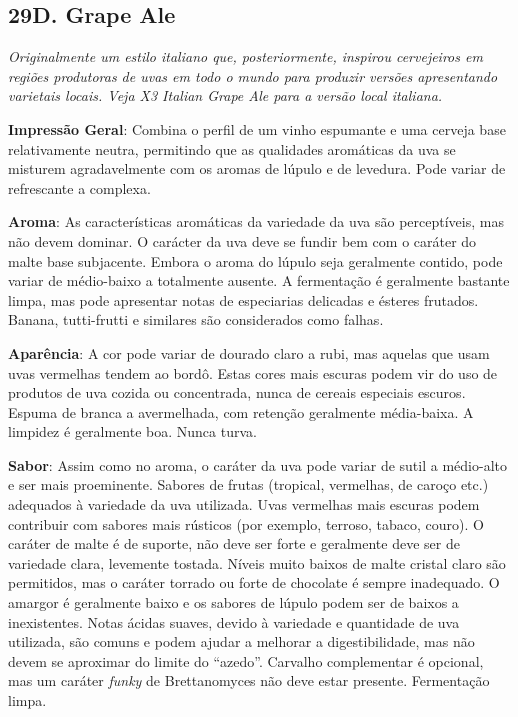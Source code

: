 \subsection*{29D. Grape Ale}
\textit{Originalmente um estilo italiano que, posteriormente, inspirou cervejeiros em regiões produtoras de uvas em todo o mundo para produzir versões apresentando varietais locais. Veja X3 Italian Grape Ale para a versão local italiana.}

\textbf{Impressão Geral}: Combina o perfil de um vinho espumante e uma cerveja base relativamente neutra, permitindo que as qualidades aromáticas da uva se misturem agradavelmente com os aromas de lúpulo e de levedura. Pode variar de refrescante a complexa.

\textbf{Aroma}: As características aromáticas da variedade da uva são perceptíveis, mas não devem dominar. O carácter da uva deve se fundir bem com o caráter do malte base subjacente. Embora o aroma do lúpulo seja geralmente contido, pode variar de médio-baixo a totalmente ausente. A fermentação é geralmente bastante limpa, mas pode apresentar notas de especiarias delicadas e ésteres frutados. Banana, tutti-frutti e similares são considerados como falhas.

\textbf{Aparência}: A cor pode variar de dourado claro a rubi, mas aquelas que usam uvas vermelhas tendem ao bordô. Estas cores mais escuras podem vir do uso de produtos de uva cozida ou concentrada, nunca de cereais especiais escuros. Espuma de branca a avermelhada, com retenção geralmente média-baixa. A limpidez é geralmente boa. Nunca turva.

\textbf{Sabor}: Assim como no aroma, o caráter da uva pode variar de sutil a médio-alto e ser mais proeminente. Sabores de frutas (tropical, vermelhas, de caroço etc.) adequados à variedade da uva utilizada. Uvas vermelhas mais escuras podem contribuir com sabores mais rústicos (por exemplo, terroso, tabaco, couro). O caráter de malte é de suporte, não deve ser forte e geralmente deve ser de variedade clara, levemente tostada. Níveis muito baixos de malte cristal claro são permitidos, mas o caráter torrado ou forte de chocolate é sempre inadequado. O amargor é geralmente baixo e os sabores de lúpulo podem ser de baixos a inexistentes. Notas ácidas suaves, devido à variedade e quantidade de uva utilizada, são comuns e podem ajudar a melhorar a digestibilidade, mas não devem se aproximar do limite do “azedo”. Carvalho complementar é opcional, mas um caráter \textit{funky} de Brettanomyces não deve estar presente. Fermentação limpa.

